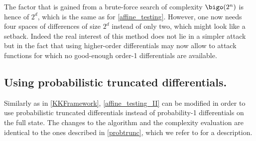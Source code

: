       The factor that is gained from a brute-force search of complexity $\bigo(2^n)$ is hence of
      $2^d$, which is the same as for \autoref{affine_testing}. However, one now needs
      four spaces of differences of size $2^d$ instead of only two,
      which might look like a setback. Indeed the real
      interest of this method does not lie in a simpler attack but in the fact that
      using higher-order differentials may now allow to attack functions for which no
      good-enough order-1 differentials are available.


    \subsection{Using probabilistic truncated differentials.}
    Similarly as in  \autoref{KKFramework}, \autoref{affine_testing_II} can be modified in order
    to use probabilistic truncated differentials instead of probability-1 differentials
    on the full state. The changes to the algorithm and the complexity evaluation are
    identical to the ones described in \autoref{probtrunc}, which we refer to for a description.
